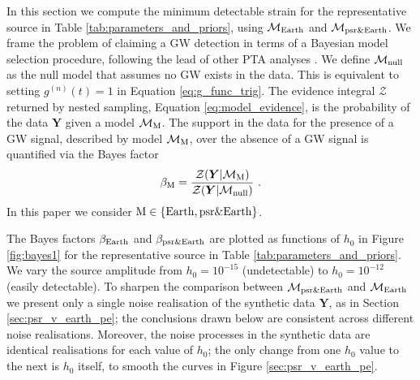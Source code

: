 \documentclass[fleqn,usenatbib,useAMS]{mnras}
\begin{document}
In this section we compute the minimum detectable strain for the representative source in Table \ref{tab:parameters_and_priors}, using $\mathcal{M}_{\rm Earth}$ and $\mathcal{M}_{\rm psr \& Earth}$. We frame the problem of claiming a GW detection in terms of a Bayesian model selection procedure, following the lead of other PTA analyses \citep[e.g.][]{2023ApJ...951L...8A,2023arXiv230616214A,2023ApJ...951L...6R,2023RAA....23g5024X}. We define $\mathcal{M}_{\rm null}$ as the null model that assumes no GW exists in the data. This is equivalent to setting $g^{(n)}(t)=1$ in Equation \eqref{eq:g_func_trig}. The evidence integral $\mathcal{Z}$ returned by nested sampling, Equation \eqref{eq:model_evidence}, is the probability of the data $\boldsymbol{Y}$ given a model $\mathcal{M}_{\rm M}$. The support in the data for the presence of a GW signal, described by model $\mathcal{M}_{\rm M}$, over the absence of a GW signal is quantified via the Bayes factor
		\begin{equation}
			\beta_{\rm M} = \frac{\mathcal{Z}(\boldsymbol{Y} | \mathcal{M}_{\rm M})}{\mathcal{Z}(\boldsymbol{Y} | \mathcal{M}_{\rm null})} \ . \label{eq:bayes}
		\end{equation}
In this paper we consider $\rm M \in \left \{ \rm Earth, psr \& Earth \right \}$. \newline 
	
The Bayes factors $\beta_{\rm Earth}$ and $\beta_{\rm psr{\&}Earth}$ are plotted as functions of $h_0$ in Figure \ref{fig:bayes1} for the representative source in Table \ref{tab:parameters_and_priors}. We vary the source amplitude from $h_0 = 10^{-15}$ (undetectable) to $h_0 = 10^{-12}$ (easily detectable). To sharpen the comparison between $\mathcal{M}_{\rm psr \& Earth}$ and $\mathcal{M}_{\rm Earth}$ we present only a single noise realisation of the synthetic data $\boldsymbol{Y}$, as in Section \ref{sec:psr_v_earth_pe}; the conclusions drawn below are consistent across different noise realisations. Moreover, the noise processes in the synthetic data are identical realisations for each value of $h_0$; the only change from one $h_0$ value to the next is $h_0$ itself, to smooth the curves in Figure \ref{sec:psr_v_earth_pe}. \newline 
\end{document}
